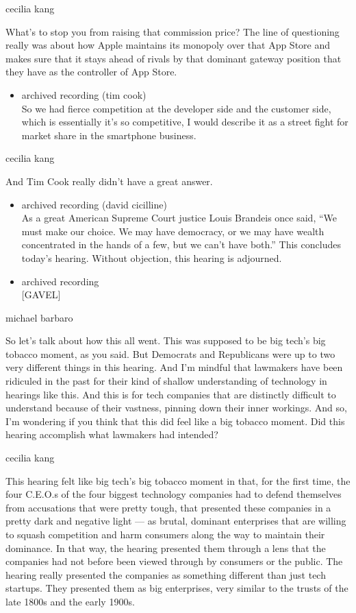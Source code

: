cecilia kang

What's to stop you from raising that commission price? The line of
questioning really was about how Apple maintains its monopoly over that
App Store and makes sure that it stays ahead of rivals by that dominant
gateway position that they have as the controller of App Store.

\begin{itemize}
\tightlist
\item
  archived recording (tim cook)\\
  So we had fierce competition at the developer side and the customer
  side, which is essentially it's so competitive, I would describe it as
  a street fight for market share in the smartphone business.
\end{itemize}

cecilia kang

And Tim Cook really didn't have a great answer.

\begin{itemize}
\item
  archived recording (david cicilline)\\
  As a great American Supreme Court justice Louis Brandeis once said,
  ``We must make our choice. We may have democracy, or we may have
  wealth concentrated in the hands of a few, but we can't have both.''
  This concludes today's hearing. Without objection, this hearing is
  adjourned.
\item
  archived recording\\
  {[}GAVEL{]}
\end{itemize}

michael barbaro

So let's talk about how this all went. This was supposed to be big
tech's big tobacco moment, as you said. But Democrats and Republicans
were up to two very different things in this hearing. And I'm mindful
that lawmakers have been ridiculed in the past for their kind of shallow
understanding of technology in hearings like this. And this is for tech
companies that are distinctly difficult to understand because of their
vastness, pinning down their inner workings. And so, I'm wondering if
you think that this did feel like a big tobacco moment. Did this hearing
accomplish what lawmakers had intended?

cecilia kang

This hearing felt like big tech's big tobacco moment in that, for the
first time, the four C.E.O.s of the four biggest technology companies
had to defend themselves from accusations that were pretty tough, that
presented these companies in a pretty dark and negative light --- as
brutal, dominant enterprises that are willing to squash competition and
harm consumers along the way to maintain their dominance. In that way,
the hearing presented them through a lens that the companies had not
before been viewed through by consumers or the public. The hearing
really presented the companies as something different than just tech
startups. They presented them as big enterprises, very similar to the
trusts of the late 1800s and the early 1900s.

